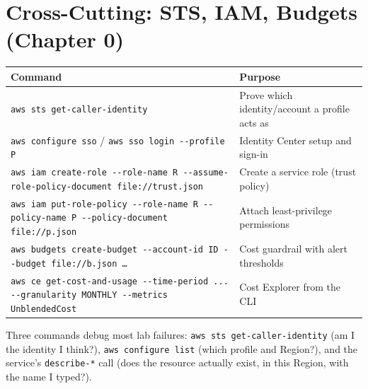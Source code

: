 \section{Cross-Cutting: STS, IAM, Budgets (Chapter 0)}
%

\begin{center}
\footnotesize
\begin{tabular}{@{}p{7.2cm}p{7.6cm}@{}}
\toprule
\textbf{Command} & \textbf{Purpose} \\
\midrule
\texttt{aws sts get-caller-identity} & Prove which identity/account a profile acts as \\
\texttt{aws configure sso} / \texttt{aws sso login -{}-profile P} & Identity Center setup and sign-in \\
\texttt{aws iam create-role -{}-role-name R -{}-assume-role-policy-document file://trust.json} & Create a service role (trust policy) \\
\texttt{aws iam put-role-policy -{}-role-name R -{}-policy-name P -{}-policy-document file://p.json} & Attach least-privilege permissions \\
\texttt{aws budgets create-budget -{}-account-id ID -{}-budget file://b.json \dots} & Cost guardrail with alert thresholds \\
\texttt{aws ce get-cost-and-usage -{}-time-period ... -{}-granularity MONTHLY -{}-metrics UnblendedCost} & Cost Explorer from the CLI \\
\bottomrule
\end{tabular}
\end{center}

\begin{tipbox}
Three commands debug most lab failures: \texttt{aws sts get-caller-identity} (am I the identity I
think?), \texttt{aws configure list} (which profile and Region?), and the service's
\texttt{describe-*} call (does the resource actually exist, in this Region, with the name I typed?).
\end{tipbox}
